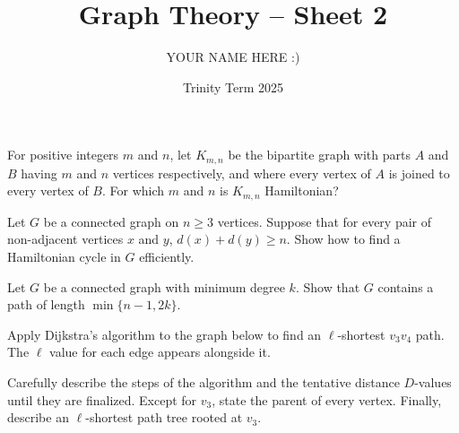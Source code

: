 \documentclass[answers]{exam}
\title{Graph Theory -- Sheet 2}
\author{YOUR NAME HERE :)}
\date{Trinity Term 2025}
\begin{document}
\maketitle
\begin{questions}

\question%
For positive integers $m$ and $n$, let $K_{m, n}$ be the bipartite graph with parts $A$ and $B$ having $m$ and $n$ vertices respectively, and where every vertex of $A$ is joined to every vertex of $B$. For which $m$ and $n$ is $K_{m, n}$ Hamiltonian?



\question%
Let $G$ be a connected graph on $n \geqslant 3$ vertices. Suppose that for every pair of non-adjacent vertices $x$ and $y$, $d(x)+d(y) \geqslant n$. Show how to find a Hamiltonian cycle in $G$ efficiently.



\question%
Let $G$ be a connected graph with minimum degree $k$. Show that $G$ contains a path of length $\min\{n-1,2k\}$.



\question%
Apply Dijkstra's algorithm to the graph below to find an $\ell$-shortest $v_{3} v_{4}$ path. The $\ell$ value for each edge appears alongside it.
\begin{center}\end{center}
Carefully describe the steps of the algorithm and the tentative distance $D$-values until they are finalized. Except for $v_{3}$, state the parent of every vertex. Finally, describe an $\ell$-shortest path tree rooted at $v_{3}$.




\end{questions}
\end{document}
